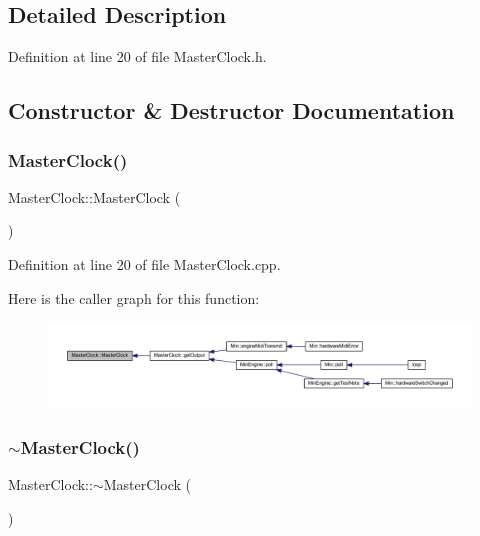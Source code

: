 \subsection{Detailed Description}


Definition at line 20 of file Master\+Clock.\+h.



\subsection{Constructor \& Destructor Documentation}
\mbox{\label{class_master_clock_a479dec94c2b2061cca4fd9ce6a8b207a}} 
\subsubsection{\texorpdfstring{Master\+Clock()}{MasterClock()}}
{\footnotesize\ttfamily Master\+Clock\+::\+Master\+Clock (\begin{DoxyParamCaption}{ }\end{DoxyParamCaption})}



Definition at line 20 of file Master\+Clock.\+cpp.

Here is the caller graph for this function\+:
\nopagebreak
\begin{figure}[H]
\begin{center}
\leavevmode
\includegraphics[width=350pt]{d6/dc3/class_master_clock_a479dec94c2b2061cca4fd9ce6a8b207a_icgraph}
\end{center}
\end{figure}
\mbox{\label{class_master_clock_aa7ff1a5f175a32f2a1d1b05a9c5ecf53}} 
\subsubsection{\texorpdfstring{$\sim$\+Master\+Clock()}{~MasterClock()}}
{\footnotesize\ttfamily Master\+Clock\+::$\sim$\+Master\+Clock (\begin{DoxyParamCaption}{ }\end{DoxyParamCaption})}




